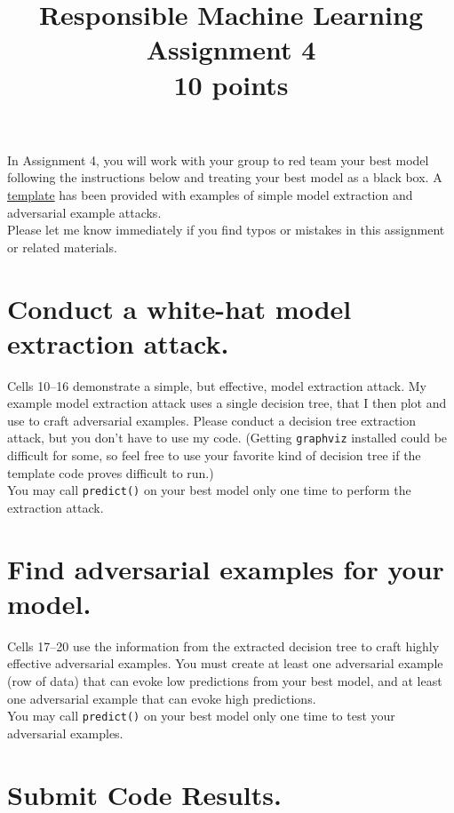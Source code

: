 \documentclass[fleqn]{article}
\title{Responsible Machine Learning\\\Large{Assignment 4}\\\Large{10 points}}
\begin{document}
\maketitle

\noindent In Assignment 4, you will work with your group to red team your best model following the instructions below and treating your best model as a black box. A \href{https://nbviewer.jupyter.org/github/jphall663/GWU_rml/blob/master/assignments/assignment_4/assign_4_template.ipynb?flush_cache=true}{template} has been provided with examples of simple model extraction and adversarial example attacks. \\

\noindent Please let me know immediately if you find typos or mistakes in this assignment or related materials. 

\section{Conduct a white-hat model extraction attack.}

Cells 10--16 demonstrate a simple, but effective, model extraction attack. My example model extraction attack uses a single decision tree, that I then plot and use to craft adversarial examples. Please conduct a decision tree extraction attack, but you don't have to use my code. (Getting \texttt{graphviz} installed could be difficult for some, so feel free to use your favorite kind of decision tree if the template code proves difficult to run.)\\

\noindent You may call \texttt{predict()} on your best model only one time to perform the extraction attack.
 
\section{Find adversarial examples for your model.}

Cells 17--20 use the information from the extracted decision tree to craft highly effective adversarial examples. You must create at least one adversarial example (row of data) that can evoke low predictions from your best model, and at least one adversarial example that can evoke high predictions.\\

\noindent You may call \texttt{predict()} on your best model only one time to test your adversarial examples.

\section{Submit Code Results.}
\end{document}
